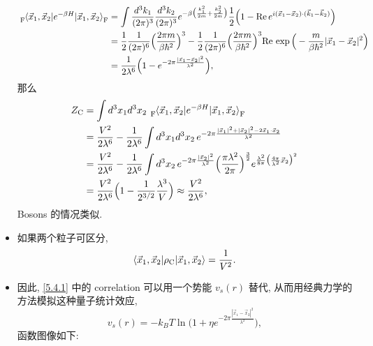 \begin{itemize}
	\begin{tcolorbox}[title=calculation:]
		\begin{align}
			\tensor[_{\text{F}}]{\braket{\vec{x}_1, \vec{x}_2 | e^{- \beta H} | \vec{x}_1, \vec{x}_2}}{_{\text{F}}} &= \int \frac{d^3 k_1}{(2 \pi)^3} \frac{d^3 k_2}{(2 \pi)^3} e^{- \beta \big( \frac{k_1^2}{2 m} + \frac{k_2^2}{2 m} \big)} \frac{1}{2} \Big( 1 - \mathrm{Re} \, e^{i (\vec{x}_1 - \vec{x}_2) \cdot (\vec{k}_1 - \vec{k}_2)} \Big) \notag \\
			&= \frac{1}{2} \frac{1}{(2 \pi)^6} \Big( \frac{2 \pi m}{\beta \hbar^2} \Big)^3 - \frac{1}{2} \frac{1}{(2 \pi)^6} \Big( \frac{2 \pi m}{\beta \hbar^2} \Big)^3 \mathrm{Re} \, \exp \Big( - \frac{m}{\beta \hbar^2} |\vec{x}_1 - \vec{x}_2|^2 \Big) \notag \\
			&= \frac{1}{2 \lambda^6} \Big( 1 - e^{- 2 \pi \frac{|\vec{x}_1 - \vec{x}_2|^2}{\lambda^2}} \Big),
		\end{align}
		那么
		\begin{align}
			Z_\text{C} &= \int d^3 x_1 d^3 x_2 \, \tensor[_{\text{F}}]{\braket{\vec{x}_1, \vec{x}_2 | e^{- \beta H} | \vec{x}_1, \vec{x}_2}}{_{\text{F}}} \notag \\
			&= \frac{V^2}{2 \lambda^6} - \frac{1}{2 \lambda^6} \int d^3 x_1 d^3 x_2 \, e^{- 2 \pi \frac{|\vec{x}_1|^2 + |\vec{x}_2|^2 - 2 \vec{x}_1 \cdot \vec{x}_2}{\lambda^2}} \notag \\
			&= \frac{V^2}{2 \lambda^6} - \frac{1}{2 \lambda^6} \int d^3 x_2 \, e^{- 2 \pi \frac{|\vec{x}_2|^2}{\lambda^2}} \Big( \frac{\pi \lambda^2}{2 \pi} \Big)^{\frac{3}{2}} e^{\frac{\lambda^2}{8 \pi} \big( \frac{4 \pi}{\lambda^2} \vec{x}_2 \big)^2} \notag \\
			&= \frac{V^2}{2 \lambda^6} \Big( 1 - \frac{1}{2^{3 / 2}} \frac{\lambda^3}{V} \Big) \approx \frac{V^2}{2 \lambda^6},
		\end{align}
		Bosons 的情况类似.
	\end{tcolorbox}
	
	\item 如果两个粒子可区分,
	\begin{equation}
		\braket{\vec{x}_1, \vec{x}_2 | \rho_\text{C} | \vec{x}_1, \vec{x}_2} = \frac{1}{V^2}.
	\end{equation}
	
	\item 因此, \eqref{5.4.1} 中的 correlation 可以用一个势能 $v_s(r)$ 替代, 从而用经典力学的方法模拟这种量子统计效应,
	\begin{equation}
		v_s(r) = - k_B T \ln \Big( 1 + \eta e^{- 2 \pi \frac{|\vec{x}_1 - \vec{x}_2|^2}{\lambda^2}} \Big),
	\end{equation}
	函数图像如下:
	

\end{itemize}
